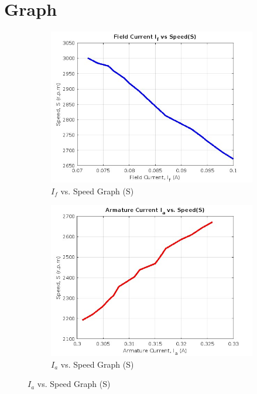 \documentclass[a4paper,12pt]{article}
\begin{document}
	\section{Graph}
	\begin{figure}[H]
		\centering
		\begin{subfigure}[t]{1\textwidth}
			\centering
				\includegraphics[width=0.9\linewidth]{Images/ifvsspeed}
			\caption{ $I_f$ vs. Speed Graph (S)}
			\vspace{0.5cm}
		\end{subfigure}
		
		\begin{subfigure}[t]{1\textwidth}
			\centering
			\includegraphics[width=0.9\linewidth]{Images/iavss}
			\caption{ $I_a$ vs. Speed Graph (S)}
		\end{subfigure}
		

	\end{figure}
\end{document}
